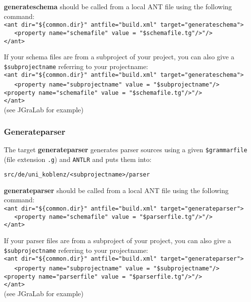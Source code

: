\documentclass
[
		a4paper,
		twoside, 										
		BCOR10mm,											
		11pt,												
		halfparskip,								
		bigheadings,								
		notitlepage,			
		pdftex											
]
{scrartcl}
\begin{document}
\textbf{generateschema} should be called from a local ANT file using the following command:\\
\footnotesize
\verb|<ant dir="${common.dir}" antfile="build.xml" target="generateschema">|\\ \verb|   <property name="schemafile" value = "$schemafile.tg"/>"/>|\\ \verb|</ant>|
\normalsize

If your schema files are from a subproject of your project, you can also give a \texttt{\$subprojectname} referring to your projectname:\\
\footnotesize
\verb|<ant dir="${common.dir}" antfile="build.xml" target="generateschema">|\\ \verb|   <property name="subprojectname" value = "$subprojectname"/>|\ \verb|   <property name="schemafile" value = "$schemafile.tg"/>"/>|\\ \verb|</ant>|
\normalsize
\\(see JGraLab for example)


\subsubsection{Generateparser}
\label{Generateparser}

The target \textbf{generateparser} generates parser sources using a given \texttt{\$grammarfile} (file extension \texttt{.g}) and \texttt{ANTLR} and puts them into:
\footnotesize
\begin{compactitem}
	\item \texttt{src/de/uni\_koblenz/<subprojectname>/parser}
\end{compactitem}
\normalsize

\textbf{generateparser} should be called from a local ANT file using the following command:\\
\footnotesize
\verb|<ant dir="${common.dir}" antfile="build.xml" target="generateparser">|\\ \verb|   <property name="schemafile" value = "$parserfile.tg"/>"/>|\\ \verb|</ant>|
\normalsize

If your parser files are from a subproject of your project, you can also give a \texttt{\$subprojectname} referring to your projectname:\\
\footnotesize
\verb|<ant dir="${common.dir}" antfile="build.xml" target="generateparser">|\\ \verb|   <property name="subprojectname" value = "$subprojectname"/>|\ \verb|   <property name="parserfile" value = "$parserfile.tg"/>"/>|\\ \verb|</ant>|
\normalsize
\\(see JGraLab for example)
\end{document}

